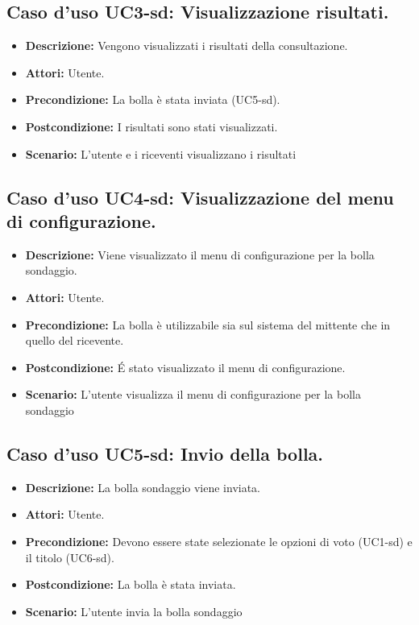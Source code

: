 \subsection{Caso d'uso UC3-sd: Visualizzazione risultati.}
\begin{itemize}
\item[]\textbf{Descrizione:} Vengono visualizzati i risultati della consultazione.
\item[]\textbf{Attori:} Utente. 
\item[]\textbf{Precondizione:} La bolla è stata inviata (UC5-sd). 
\item[]\textbf{Postcondizione:} I risultati sono stati visualizzati. 
\item[]\textbf{Scenario:}
L'utente e i riceventi visualizzano i risultati 
\end{itemize}

\subsection{Caso d'uso UC4-sd: Visualizzazione del menu di configurazione.}
\begin{itemize}
\item[]\textbf{Descrizione:} Viene visualizzato il menu di configurazione per la bolla sondaggio.
\item[]\textbf{Attori:} Utente. 
\item[]\textbf{Precondizione:} La bolla è utilizzabile sia sul sistema del mittente che in quello del ricevente. 
\item[]\textbf{Postcondizione:} \'E stato visualizzato il menu di configurazione. 
\item[]\textbf{Scenario:}
L'utente visualizza il menu di configurazione per la bolla sondaggio 
\end{itemize}

\subsection{Caso d'uso UC5-sd: Invio della bolla.}
\begin{itemize}
\item[]\textbf{Descrizione:} La bolla sondaggio viene inviata.
\item[]\textbf{Attori:} Utente. 
\item[]\textbf{Precondizione:} Devono essere state selezionate le opzioni di voto (UC1-sd) e il titolo (UC6-sd). 
\item[]\textbf{Postcondizione:} La bolla è stata inviata. 
\item[]\textbf{Scenario:}
L'utente invia la bolla sondaggio 
\end{itemize}

